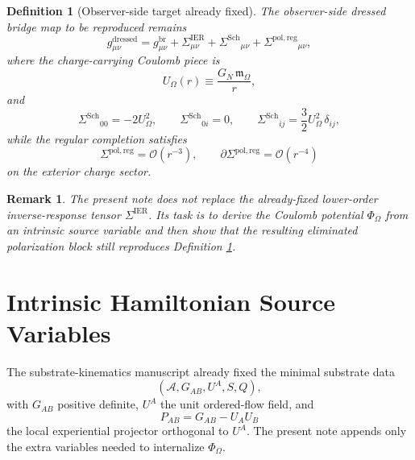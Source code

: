 \documentclass[11pt]{article}
\newcommand{\Sub}{\mathcal{A}}
\newcommand{\ProjSub}{P}
\newcommand{\FlowPot}{\Phi_\Omega}
\newcommand{\CoulPot}{U_\Omega}
\newcommand{\HamChargeOmega}{\mathfrak m_\Omega}
\newcommand{\SigmaIER}{\Sigma^{\mathrm{IER}}}
\newcommand{\SigmaDressSch}{\Sigma^{\mathrm{Sch}}}
\newcommand{\SigmaRegPol}{\Sigma^{\mathrm{pol,reg}}}
\newtheorem{definition}{Definition}
\newtheorem{remark}{Remark}
\begin{document}
\begin{definition}[Observer-side target already fixed]
\label{def:target}
The observer-side dressed bridge map to be reproduced remains
\begin{equation}
g_{\mu\nu}^{\mathrm{dressed}}
=
g_{\mu\nu}^{\mathrm{br}}
+\SigmaIER_{\mu\nu}
+\SigmaDressSch{}_{\mu\nu}
+\SigmaRegPol{}_{\mu\nu},
\label{eq:targetmetric}
\end{equation}
where the charge-carrying Coulomb piece is
\begin{equation}
\CoulPot(r)\equiv \frac{G_N\,\HamChargeOmega}{r},
\label{eq:coulpot}
\end{equation}
and
\begin{equation}
\SigmaDressSch{}_{00}=-2\CoulPot^2,
\qquad
\SigmaDressSch{}_{0i}=0,
\qquad
\SigmaDressSch{}_{ij}=\frac32\CoulPot^2\,\delta_{ij},
\label{eq:schdress}
\end{equation}
while the regular completion satisfies
\begin{equation}
\SigmaRegPol=\mathcal O(r^{-3}),
\qquad
\partial\SigmaRegPol=\mathcal O(r^{-4})
\label{eq:reg}
\end{equation}
on the exterior charge sector.
\end{definition}

\begin{remark}
The present note does not replace the already-fixed lower-order inverse-response tensor \(\SigmaIER\). Its task is to derive the Coulomb potential \(\FlowPot\) from an intrinsic source variable and then show that the resulting eliminated polarization block still reproduces Definition \ref{def:target}.
\end{remark}

\section{Intrinsic Hamiltonian Source Variables}

The substrate-kinematics manuscript already fixed the minimal substrate data
\[
(\Sub,G_{AB},U^A,S,Q),
\]
with \(G_{AB}\) positive definite, \(U^A\) the unit ordered-flow field, and
\begin{equation}
\ProjSub_{AB}=G_{AB}-U_AU_B
\label{eq:projector}
\end{equation}
the local experiential projector orthogonal to \(U^A\). The present note appends only the extra variables needed to internalize \(\FlowPot\).
\end{document}
